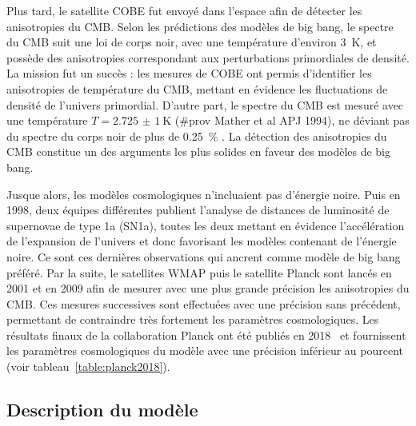 \documentclass[11pt, twoside, a4paper, openright]{report}
\begin{document}
Plus tard, le satellite COBE fut envoyé dans l'espace afin de détecter les anisotropies du CMB. Selon les prédictions des modèles de big bang, le spectre du CMB suit une loi de corps noir, avec une température d'environ \SI{3}{\kelvin}, et possède des anisotropies correspondant aux perturbations primordiales de densité. La mission fut un succès : les mesures de COBE ont permis d'identifier les anisotropies de température du CMB, mettant en évidence les fluctuations de densité de l'univers primordial. D'autre part, le spectre du CMB est mesuré avec une température $T = \SI{2,725(1)}{\kelvin}$ (\#prov Mather et al APJ 1994), ne déviant pas du spectre du corps noir de plus de \SI{0,25}{\percent} \cite{CITE:https://www.ncbi.nlm.nih.gov/pmc/articles/PMC46596/}. La détection des anisotropies du CMB constitue un des arguments les plus solides en faveur des modèles de big bang.

Jusque alors, les modèles cosmologiques n'incluaient pas d'énergie noire. Puis en 1998, deux équipes différentes publient l'analyse de distances de luminosité de supernovae de type 1a (SN1a), toutes les deux mettant en évidence l'accélération de l'expansion de l'univers et donc favorisant les modèles contenant de l'énergie noire. Ce sont ces dernières observations qui ancrent \lcdm{} comme modèle de big bang préféré. Par la suite, le satellites WMAP puis le satellite Planck sont lancés en 2001 et en 2009 afin de mesurer avec une plus grande précision les anisotropies du CMB. Ces mesures successives sont effectuées avec une précision sans précédent, permettant de contraindre très fortement les paramètres cosmologiques. Les résultats finaux de la collaboration Planck ont été publiés en 2018~\cite{CITE:planck2018} et fournissent les paramètres cosmologiques du modèle \lcdm{} avec une précision inférieur au pourcent (voir tableau~\ref{table:planck2018}).

\subsection{Description du modèle}
\label{subsec:descri_mod}
\end{document}

